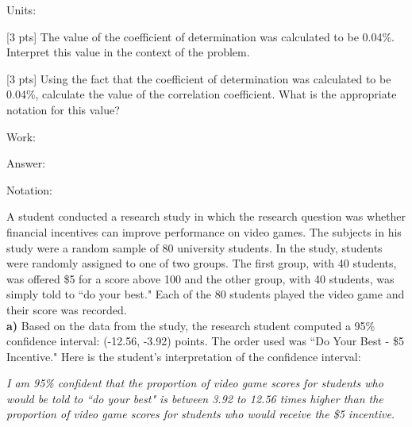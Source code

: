 \documentclass[12pt, oneside]{article}
\newcommand{\noi}{\noindent}
\begin{document}
Units: \underline{\hspace{2in}}

\vspace{0.5cm}

\noi {\bf (f)} [3 pts] The value of the coefficient of determination was
calculated to be 0.04\%.  Interpret this value in the context of the problem.

\vspace{1in}

\noi {\bf (g)} [3 pts] Using the fact that the coefficient of determination was
calculated to be 0.04\%, calculate the value of the correlation coefficient. 
What is the appropriate notation for this value? 

\vspace{0.25cm}

Work:  

\vspace{0.5cm}

Answer: \underline{\hspace{2in}}

Notation: \underline{\hspace{2in}}

\vspace{0.5cm}

\noi{\bf Q3.} A student conducted a research study in which the research question was whether financial incentives can improve performance on video games. The subjects in his study were a random sample of 80 university students. In the study, students were randomly assigned to one of two groups. The first group, with 40 students, was offered \$5 for a score above 100 and the other group, with 40 students, was simply told to ``do your best." Each of the 80 students played the video game and their score was recorded.\\

\noi
{\bf a)} Based on the data from the study, the research student computed a 95\% confidence interval: (-12.56, -3.92) points. The order used was ``Do Your Best - \$5 Incentive." Here is the student's interpretation of the confidence interval:\\
\begin{center}
\emph{I am 95\% confident that the proportion of video game scores for students who would be told to ``do your best" is between 3.92 to 12.56 times higher than the proportion of video game scores for students who would receive the \$5 incentive.}
\end{center}
\end{document}
